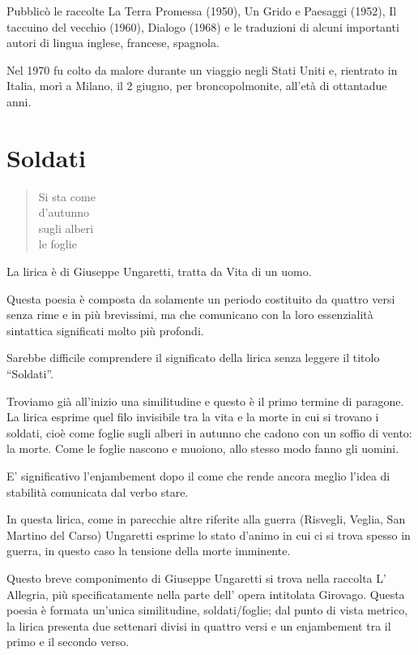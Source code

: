 Pubblicò le raccolte La Terra Promessa (1950), Un Grido e Paesaggi (1952), Il taccuino del vecchio (1960), Dialogo (1968) e le traduzioni di alcuni importanti autori di lingua inglese, francese, spagnola.

Nel 1970 fu colto da malore durante un viaggio negli Stati Uniti e, rientrato in Italia, morì a Milano, il 2 giugno, per broncopolmonite, all’età di ottantadue anni.

\section{Soldati}

\begin{verse}
  Si sta come \\
  d'autunno \\
  sugli alberi \\
  le foglie
\end{verse}

La lirica è di Giuseppe Ungaretti, tratta da Vita di un uomo.

Questa poesia è composta da solamente un periodo costituito da quattro versi senza rime e in più brevissimi, ma che comunicano con la loro essenzialità sintattica significati molto più profondi.

\noindent
Sarebbe difficile comprendere il significato della lirica senza leggere il titolo “Soldati”.

Troviamo già all’inizio una similitudine e questo è il primo termine di paragone. La lirica esprime quel filo invisibile tra la vita e la morte in cui si trovano i soldati, cioè come foglie sugli alberi in autunno che cadono con un soffio di vento: la morte. Come le foglie nascono e muoiono, allo stesso modo fanno gli uomini.

E’ significativo l’enjambement dopo il come che rende ancora meglio l’idea di stabilità comunicata dal verbo stare.

In questa lirica, come in parecchie altre riferite alla guerra (Risvegli, Veglia, San Martino del Carso) Ungaretti esprime lo stato d’animo in cui ci si trova spesso in guerra, in questo caso la tensione della morte imminente.

Questo breve componimento di Giuseppe Ungaretti  si trova nella raccolta L’ Allegria, più specificatamente nella parte dell’ opera intitolata Girovago. Questa poesia è formata un’unica similitudine, soldati/foglie; dal punto di vista metrico, la lirica presenta due settenari divisi in quattro versi e un enjambement tra il primo e il secondo verso.

